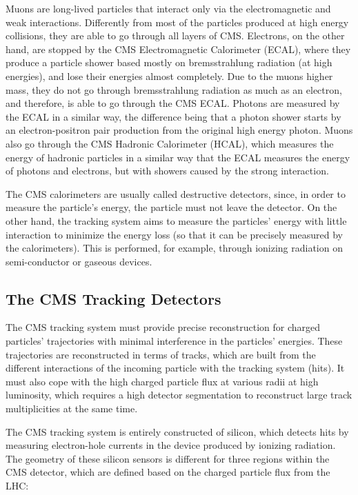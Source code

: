 Muons are long-lived particles that interact only via the electromagnetic and weak interactions. 
Differently from most of the particles produced at high energy collisions, they are able to go through all layers of CMS. 
Electrons, on the other hand, are stopped by the CMS Electromagnetic Calorimeter (ECAL), where they produce a particle shower based mostly on bremsstrahlung radiation (at high energies), and lose their energies almost completely. 
Due to the muons higher mass, they do not go through bremsstrahlung radiation as much as an electron, and therefore, is able to go through the CMS ECAL. 
Photons are measured by the ECAL in a similar way, the difference being that a photon shower starts by an electron-positron pair production from the original high energy photon. 
Muons also go through the CMS Hadronic Calorimeter (HCAL), which measures the energy of hadronic particles in a similar way that the ECAL measures the energy of photons and electrons, but with showers caused by the strong interaction. 

The CMS calorimeters are usually called destructive detectors, since, in order to measure the particle's energy, the particle must not leave the detector.
On the other hand, the tracking system aims to measure the particles' energy with little interaction to minimize the energy loss (so that it can be precisely measured by the calorimeters). 
This is performed, for example, through ionizing radiation on semi-conductor or gaseous devices. 

\subsection{The CMS Tracking Detectors}

The CMS tracking system must provide precise reconstruction for charged particles' trajectories with minimal interference in the particles' energies. 
These trajectories are reconstructed in terms of tracks, which are built from the different interactions of the incoming particle with the tracking system (hits). 
It must also cope with the high charged particle flux at various radii at high luminosity, which requires a high detector segmentation to reconstruct large track multiplicities at the same time. 

The CMS tracking system is entirely constructed of silicon, which detects hits by measuring electron-hole currents in the device produced by ionizing radiation. 
The geometry of these silicon sensors is different for three regions within the CMS detector, which are defined based on the charged particle flux from the LHC:

